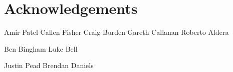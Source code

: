 \chapter{Acknowledgements}
Amir Patel
Callen Fisher
Craig Burden
Gareth Callanan
Roberto Aldera

Ben Bingham
Luke Bell

Justin Pead
Brendan Daniels